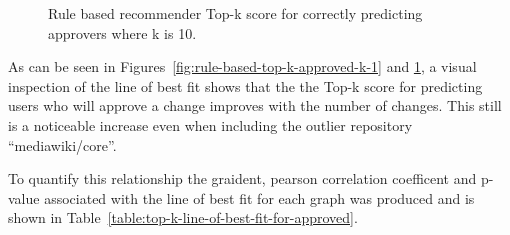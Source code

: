 \begin{figure}[H]%
    \centering
    \caption{Rule based recommender Top-k score for correctly predicting approvers where k is 10.}%
    \label{fig:rule-based-top-k-approved-k-10}%
\end{figure}

As can be seen in Figures~\ref{fig:rule-based-top-k-approved-k-1} and \ref{fig:rule-based-top-k-approved-k-10}, a visual inspection of the line of best fit shows that the the Top-k score for predicting users who will approve a change improves with the number of changes. This still is a noticeable increase even when including the outlier repository ``mediawiki/core''.

To quantify this relationship the graident, pearson correlation coefficent and p-value associated with the line of best fit for each graph was produced and is shown in Table~\ref{table:top-k-line-of-best-fit-for-approved}.

